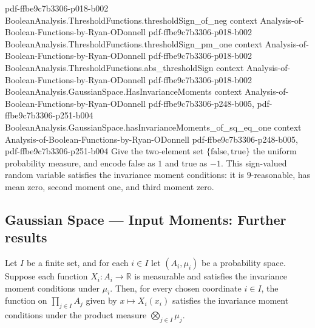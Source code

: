 \begin{lemma}
  {pdf-ffbe9c7b3306-p018-b002}
\proofstep
  {BooleanAnalysis.ThresholdFunctions.thresholdSign_of_neg}
  {context}
  {Analysis-of-Boolean-Functions-by-Ryan-ODonnell}
  {pdf-ffbe9c7b3306-p018-b002}
\proofstep
  {BooleanAnalysis.ThresholdFunctions.thresholdSign_pm_one}
  {context}
  {Analysis-of-Boolean-Functions-by-Ryan-ODonnell}
  {pdf-ffbe9c7b3306-p018-b002}
\proofstep
  {BooleanAnalysis.ThresholdFunctions.abs_thresholdSign}
  {context}
  {Analysis-of-Boolean-Functions-by-Ryan-ODonnell}
  {pdf-ffbe9c7b3306-p018-b002}
\proofstep
  {BooleanAnalysis.GaussianSpace.HasInvarianceMoments}
  {context}
  {Analysis-of-Boolean-Functions-by-Ryan-ODonnell}
  {pdf-ffbe9c7b3306-p248-b005,
    pdf-ffbe9c7b3306-p251-b004}
\proofstep
  {BooleanAnalysis.GaussianSpace.hasInvarianceMoments_of_sq_eq_one}
  {context}
  {Analysis-of-Boolean-Functions-by-Ryan-ODonnell}
  {pdf-ffbe9c7b3306-p248-b005,
    pdf-ffbe9c7b3306-p251-b004}
Give the two-element set $\{\mathrm{false},\mathrm{true}\}$ the uniform probability
measure, and encode false as $1$ and true as $-1$. This sign-valued random variable
satisfies the invariance moment conditions: it is $9$-reasonable, has mean zero, second
moment one, and third moment zero.
\end{lemma}

\subsection*{Gaussian Space --- Input Moments: Further results}

\begin{lemma}
\label{BooleanAnalysis.GaussianSpace.hasInvarianceMoments_pi_coordinate}
\leanok
{}
Let $I$ be a finite set, and for each $i\in I$ let $(A_i,\mu_i)$ be a probability space.
Suppose each function $X_i\colon A_i\to\mathbb R$ is measurable and satisfies the
invariance moment conditions under $\mu_i$. Then, for every chosen coordinate $i\in I$,
the function on $\prod_{j\in I}A_j$ given by $x\mapsto X_i(x_i)$ satisfies the
invariance moment conditions under the product measure $\bigotimes_{j\in I}\mu_j$.
\end{lemma}

